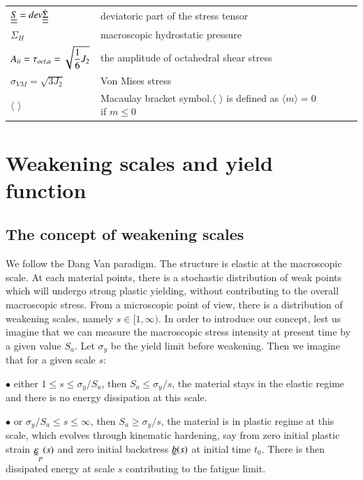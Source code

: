 \documentclass[3p,times,procedia,number]{elsarticle}
\begin{document}
\begin{flushleft}
\begin{table}[h]
\begin{tabular}{lllll}
$\uline{\uline{S}}=dev\dot{\uline{\uline{\Sigma}}}$ & deviatoric part of the stress tensor &  &  &  \\
$\Sigma_H$& macroscopic hydrostatic pressure &  &  &  \\
$A_{\uppercase\expandafter{\romannumeral2}}=\tau_{oct,a}=\sqrt{\dfrac{1}{6}J_{2}}$& the amplitude of octahedral shear stress &  &  &  \\
$\sigma_{VM}=\sqrt{3J_{2}}$& Von Mises stress &  &  &  \\
$\langle$ $\rangle$& Macaulay bracket symbol.$\langle$ $\rangle$ is defined as $\langle m\rangle=0$ if $m\leqslant0$
\end{tabular}
\end{table}
\end{flushleft}

\clearpage
\section{Weakening scales and yield function}
\label{sec:5.4}
\subsection{The concept of weakening scales} 

We follow the Dang Van paradigm. The structure is elastic at the macroscopic scale. At each material points, there is a stochastic distribution of weak points which will undergo strong plastic yielding, without contributing to the overall macroscopic stress. From a microscopic point of view, there is a distribution of weakening scales, namely $s\in[1,\infty)$. In order to introduce our concept, lest us imagine that we can measure the macroscopic stress intensity at present time by a given value $S_{a}$. Let $\sigma_y$ be the yield limit before weakening. Then we imagine that for a given scale $s$:

\vspace{6pt}
\noindent
$\bullet$ either $1\leqslant s\leqslant \sigma_y/S_{a}$, then $S_{a}\leqslant \sigma_y/s$, the material stays in the elastic regime and there is no energy dissipation at this scale.

\vspace{6pt}
\noindent
$\bullet$ or $\sigma_y/S_{a}\leqslant s\leqslant \infty$, then $S_{a}\geqslant \sigma_y/s$, the material is in plastic regime at this scale, which evolves through kinematic hardening, say from zero initial plastic strain $\uuline{\varepsilon}_p(s)$ and zero initial backstress $\uuline{b}(s)$ at initial time $t_0$. There is then dissipated energy at scale $s$ contributing to the fatigue limit.
\end{document}
